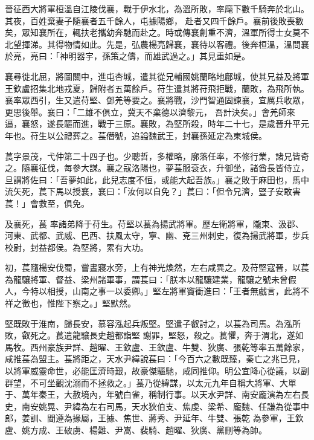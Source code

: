 \begin{pinyinscope}
 晉征西大將軍桓溫自江陵伐襄，戰于伊水北，為溫所敗，率麾下數千騎奔於北山。其夜，百姓棄妻子隨襄者五千餘人，屯據陽鄉，
 赴者又四千餘戶。襄前後敗喪數矣，眾知襄所在，輒扶老攜幼奔馳而赴之。時或傳襄創重不濟，溫軍所得士女莫不北望揮涕。其得物情如此。先是，弘農楊亮歸襄，襄待以客禮。後奔桓溫，溫問襄於亮，亮曰：「神明器宇，孫策之儔，而雄武過之。」其見重如是。



 襄尋徙北屈，將圖關中，進屯杏城，遣其從兄輔國姚蘭略地鄜城，使其兄益及將軍王欽盧招集北地戎夏，歸附者五萬餘戶。苻生遣其將苻飛拒戰，蘭敗，為飛所執。襄率眾西引，生又遣苻堅、鄧羌等要之。襄將戰，沙門智通固諫襄，宜厲兵收眾，更思後舉。襄曰：「二雄不俱立，冀天不棄德以濟黎元，
 吾計決矣。」會羌師來逼，襄怒，遂長驅而進，戰于三原。襄敗，為堅所殺，時年二十七，是歲晉升平元年也。苻生以公禮葬之。萇僭號，追謚魏武王，封襄孫延定為東城侯。



 萇字景茂，弋仲第二十四子也。少聰哲，多權略，廓落任率，不修行業，諸兄皆奇之。隨襄征伐，每參大謀。襄之寇洛陽也，夢萇服袞衣，升御坐，諸酋長皆侍立，旦謂將佐曰：「吾夢如此，此兒志度不恒，或能大起吾族。」襄之敗于麻田也，馬中流矢死，萇下馬以授襄，襄曰：「汝何以自免？」萇曰：「但令兄濟，豎子安敢害萇！」會救至，俱免。



 及襄死，萇
 率諸弟降于苻生。苻堅以萇為揚武將軍。歷左衛將軍，隴東、汲郡、河東、武都、武威、巴西、扶風太守，寧、幽、兗三州刺史，復為揚武將軍，步兵校尉，封益都侯。為堅將，累有大功。



 初，萇隨楊安伐蜀，嘗晝寢水旁，上有神光煥然，左右咸異之。及苻堅寇晉，以萇為龍驤將軍、督益、梁州諸軍事，謂萇曰：「朕本以龍驤建業，龍驤之號未曾假人，今特以相授，山南之事一以委卿。」堅左將軍竇衝進曰：「王者無戲言，此將不祥之徵也，惟陛下察之。」堅默然。



 堅既敗于淮南，歸長安，慕容泓起兵叛堅。堅遣子叡討之，以萇為司馬。為泓所敗，叡死之。萇遣龍驤長史趙都詣堅
 謝罪，堅怒，殺之。萇懼，奔于渭北，遂如馬牧。西州豪族尹詳、趙曜、王欽盧、王欽盧、牛雙、狄廣、張乾等率五萬餘家，咸推萇為盟主。萇將距之，天水尹緯說萇曰：「今百六之數既臻，秦亡之兆已見，以將軍威靈命世，必能匡濟時艱，故豪傑驅馳，咸同推仰。明公宜降心從議，以副群望，不可坐觀沈溺而不拯救之。」萇乃從緯謀，以太元九年自稱大將軍、大單于、萬年秦王，大赦境內，年號白雀，稱制行事。以天水尹詳、南安龐演為左右長史，南安姚晃、尹緯為左右司馬，天水狄伯支、焦虔、梁希、龐魏、任謙為從事中郎，姜訓、閻遵為掾屬，王據、焦世、蔣秀、尹延年、牛雙、張乾
 為參軍，王欽盧、姚方成、王破虜、楊難、尹嵩、裴騎、趙曜、狄廣、黨刪等為帥。




\end{pinyinscope}
